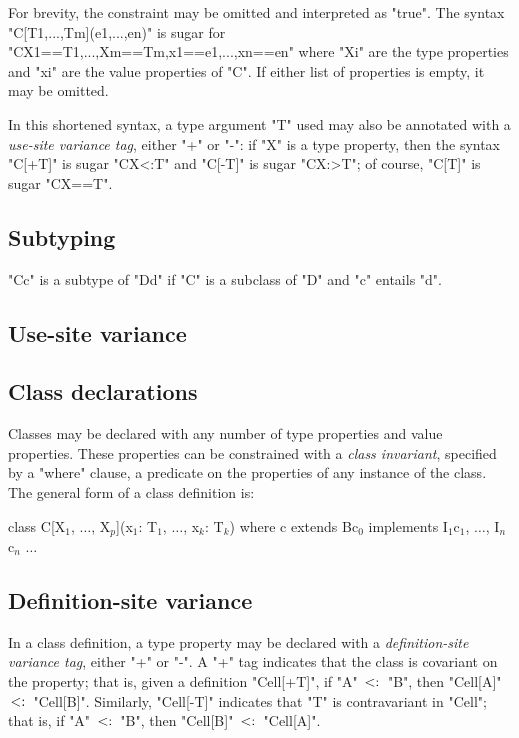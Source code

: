 \documentclass[preprint,nocopyrightspace,9pt]{sigplanconf}
\begin{document}
For brevity, the constraint may be omitted and
interpreted as \xcd"true".
The syntax
\xcd"C[T1,...,Tm](e1,...,en)" is sugar for
\xcd"C{X1==T1,...,Xm==Tm,x1==e1,...,xn==en}"
where \xcd"Xi" are the type properties and \xcd"xi" are the
value properties of \xcd"C".
If either list of properties is empty, it may be omitted.

In this shortened syntax, a type argument \xcd"T" used may also be annotated
with
a \emph{use-site variance tag}, either \xcd"+" or \xcd"-":
if \xcd"X" is a type property, then
the syntax \xcd"C[+T]" is sugar \xcd"C{X<:T}" and
\xcd"C[-T]" is sugar \xcd"C{X:>T}"; of course,
\xcd"C[T]" is sugar \xcd"C{X==T}".


\subsection{Subtyping}

\xcd"C{c}" is a subtype of \xcd"D{d}" if \xcd"C" is a subclass
of \xcd"D" and \xcd"c" entails \xcd"d".

\subsection{Use-site variance}

\subsection{Class declarations}

Classes may be declared with any number of type properties and
value properties.  These properties can be constrained with a
\emph{class invariant}, specified by a \xcd"where" clause,
a predicate on the properties of any instance of the class.
%
The general form of a class definition is:
\begin{xtenmath}
class C[X$_1$, $\dots$, X$_p$](x$_1$: T$_1$, $\dots$, x$_k$: T$_k$)
      where c
      extends B{c$_0$}
      implements I$_1${c$_1$}, $\dots$, I$_n${c$_n$} {$\dots$}
\end{xtenmath}

\subsection{Definition-site variance}

In a class definition,
a type property may be declared with a \emph{definition-site variance tag}, either \xcd"+" or
\xcd"-".  A \xcd"+" tag indicates that the class is covariant on
the property; that is, given a definition
\xcd"Cell[+T]",
if \xcd"A" $\subtype$ \xcd"B", then
\xcd"Cell[A]" $\subtype$ \xcd"Cell[B]".
Similarly,
\xcd"Cell[-T]" indicates that \xcd"T" is contravariant in \xcd"Cell";
that is, if \xcd"A" $\subtype$ \xcd"B", then
\xcd"Cell[B]" $\subtype$ \xcd"Cell[A]".
\end{document}
